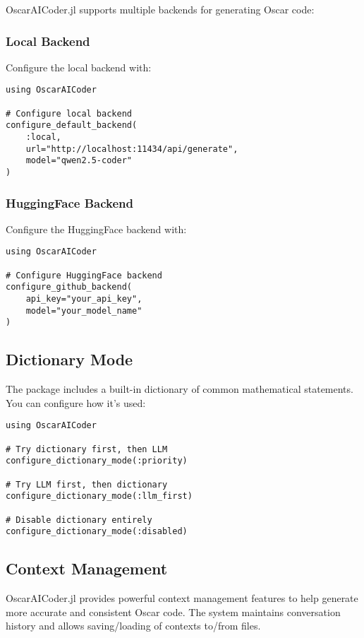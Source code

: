 \documentclass[11pt,a4paper]{article}
\begin{document}
OscarAICoder.jl supports multiple backends for generating Oscar code:

\subsubsection{Local Backend}

Configure the local backend with:

\begin{lstlisting}
using OscarAICoder

# Configure local backend
configure_default_backend(
    :local,
    url="http://localhost:11434/api/generate",
    model="qwen2.5-coder"
)
\end{lstlisting}

\subsubsection{HuggingFace Backend}

Configure the HuggingFace backend with:

\begin{lstlisting}
using OscarAICoder

# Configure HuggingFace backend
configure_github_backend(
    api_key="your_api_key",
    model="your_model_name"
)
\end{lstlisting}

\subsection{Dictionary Mode}

The package includes a built-in dictionary of common mathematical statements. You can configure how it's used:

\begin{lstlisting}
using OscarAICoder

# Try dictionary first, then LLM
configure_dictionary_mode(:priority)

# Try LLM first, then dictionary
configure_dictionary_mode(:llm_first)

# Disable dictionary entirely
configure_dictionary_mode(:disabled)
\end{lstlisting}

\subsection{Context Management}

OscarAICoder.jl provides powerful context management features to help generate more accurate and consistent Oscar code. The system maintains conversation history and allows saving/loading of contexts to/from files.
\end{document}
